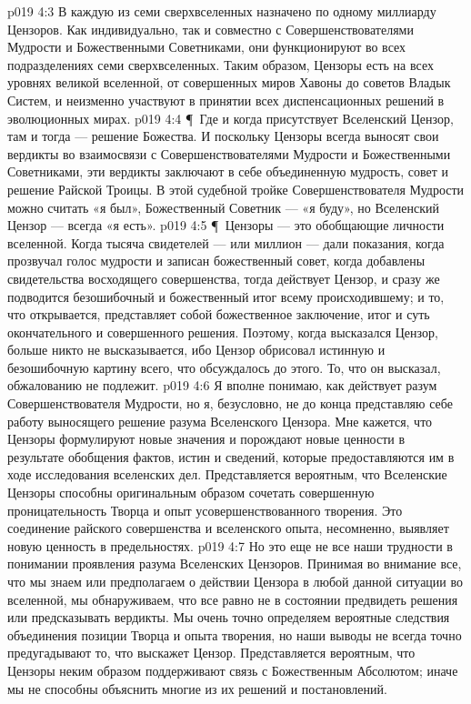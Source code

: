 \vs p019 4:3 В каждую из семи сверхвселенных назначено по одному миллиарду Цензоров. Как индивидуально, так и совместно с Совершенствователями Мудрости и Божественными Советниками, они функционируют во всех подразделениях семи сверхвселенных. Таким образом, Цензоры есть на всех уровнях великой вселенной, от совершенных миров Хавоны до советов Владык Систем, и неизменно участвуют в принятии всех диспенсационных решений в эволюционных мирах.
\vs p019 4:4 \P\ Где и когда присутствует Вселенский Цензор, там и тогда --- решение Божества. И поскольку Цензоры всегда выносят свои вердикты во взаимосвязи с Совершенствователями Мудрости и Божественными Советниками, эти вердикты заключают в себе объединенную мудрость, совет и решение Райской Троицы. В этой судебной тройке Совершенствователя Мудрости можно считать «я был», Божественный Советник --- «я буду», но Вселенский Цензор --- всегда «я есть».
\vs p019 4:5 \P\ Цензоры --- это обобщающие личности вселенной. Когда тысяча свидетелей --- или миллион --- дали показания, когда прозвучал голос мудрости и записан божественный совет, когда добавлены свидетельства восходящего совершенства, тогда действует Цензор, и сразу же подводится безошибочный и божественный итог всему происходившему; и то, что открывается, представляет собой божественное заключение, итог и суть окончательного и совершенного решения. Поэтому, когда высказался Цензор, больше никто не высказывается, ибо Цензор обрисовал истинную и безошибочную картину всего, что обсуждалось до этого. То, что он высказал, обжалованию не подлежит.
\vs p019 4:6 Я вполне понимаю, как действует разум Совершенствователя Мудрости, но я, безусловно, не до конца представляю себе работу выносящего решение разума Вселенского Цензора. Мне кажется, что Цензоры формулируют новые значения и порождают новые ценности в результате обобщения фактов, истин и сведений, которые предоставляются им в ходе исследования вселенских дел. Представляется вероятным, что Вселенские Цензоры способны оригинальным образом сочетать совершенную проницательность Творца и опыт усовершенствованного творения. Это соединение райского совершенства и вселенского опыта, несомненно, выявляет новую ценность в предельностях.
\vs p019 4:7 Но это еще не все наши трудности в понимании проявления разума Вселенских Цензоров. Принимая во внимание все, что мы знаем или предполагаем о действии Цензора в любой данной ситуации во вселенной, мы обнаруживаем, что все равно не в состоянии предвидеть решения или предсказывать вердикты. Мы очень точно определяем вероятные следствия объединения позиции Творца и опыта творения, но наши выводы не всегда точно предугадывают то, что выскажет Цензор. Представляется вероятным, что Цензоры неким образом поддерживают связь с Божественным Абсолютом; иначе мы не способны объяснить многие из их решений и постановлений.
